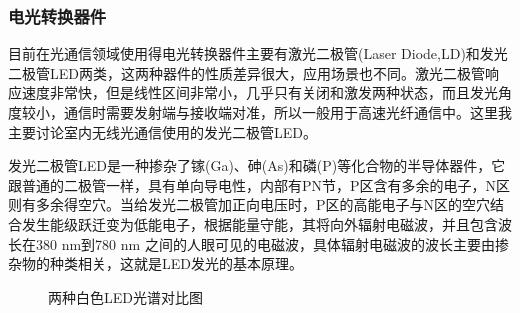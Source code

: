 \subsubsection{电光转换器件}
目前在光通信领域使用得电光转换器件主要有激光二极管(Laser Diode,LD)和发光二极管LED两类，这两种器件的性质差异很大，应用场景也不同。激光二极管响应速度非常快，但是线性区间非常小，几乎只有关闭和激发两种状态，而且发光角度较小，通信时需要发射端与接收端对准，所以一般用于高速光纤通信中。这里我主要讨论室内无线光通信使用的发光二极管LED。

发光二极管LED是一种掺杂了镓(Ga)、砷(As)和磷(P)等化合物的半导体器件，它跟普通的二极管一样，具有单向导电性，内部有PN节，P区含有多余的电子，N区则有多余得空穴。当给发光二极管加正向电压时，P区的高能电子与N区的空穴结合发生能级跃迁变为低能电子，根据能量守能，其将向外辐射电磁波，并且包含波长在380 nm到780 nm 之间的人眼可见的电磁波，具体辐射电磁波的波长主要由掺杂物的种类相关，这就是LED发光的基本原理。

\begin{figure}[htbp]
    \centering
    \caption{两种白色LED光谱对比图}
    \label{fig:WhiteLED}
\end{figure}

